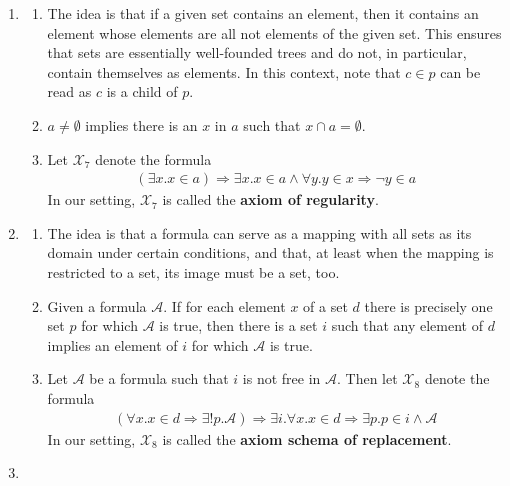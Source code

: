\begin{enumerate}
\begin{enumerate}
\end{enumerate}
\item[(7)]
\begin{enumerate}
\item[$\bullet$]
The idea is that if a given set contains an element, then it contains an element whose elements are all not elements of the given set.
This ensures that sets are essentially well-founded trees and do not, in particular, contain themselves as elements.
In this context, note that $c \in p$ can be read as $c$ is a child of $p$.
\item[$\bullet$]
$a \neq \emptyset$ implies there is an $x$ in $a$ such that $x \cap a = \emptyset$.
\item[$\bullet$]
Let $\mathcal{X}_{7}$ denote the formula
\begin{align*}
  \left(
    \exists
    x
    .
    x
    \in
    a
  \right)
  \Rightarrow
  \exists
  x
  .
  x
  \in
  a
  \land
  \forall
  y
  .
  y
  \in
  x
  \Rightarrow
  \neg
  y
  \in
  a
\end{align*}
In our setting, $\mathcal{X}_{7}$ is called the \textbf{axiom of regularity}.
\end{enumerate}
\item[(8)]
\begin{enumerate}
\item[$\bullet$]
The idea is that a formula can serve as a mapping with all sets as its domain under certain conditions, and that, at least when the mapping is restricted to a set, its image must be a set, too.
\item[$\bullet$]
Given a formula $\mathcal{A}$.
If for each element $x$ of a set $d$ there is precisely one set $p$ for which $\mathcal{A}$ is true, then there is a set $i$ such that any element of $d$ implies an element of $i$ for which $\mathcal{A}$ is true.
\item[$\bullet$]
Let $\mathcal{A}$ be a formula such that $i$ is not free in $\mathcal{A}$.
Then let $\mathcal{X}_{8}$ denote the formula
\begin{align*}
  \left(
    \forall
    x
    .
    x
    \in
    d
    \Rightarrow
    \exists!
    p
    .
    \mathcal{A}
  \right)
  \Rightarrow
  \exists
  i
  .
  \forall
  x
  .
  x
  \in
  d
  \Rightarrow
  \exists
  p
  .
  p
  \in
  i
  \land
  \mathcal{A}
\end{align*}
In our setting, $\mathcal{X}_{8}$ is called the \textbf{axiom schema of replacement}.
\end{enumerate}
\item[(9)]

\end{enumerate}
